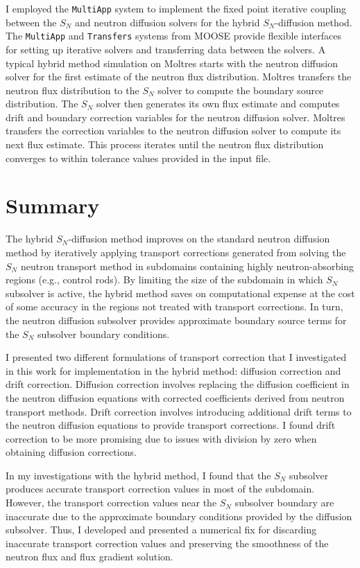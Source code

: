 I employed the \texttt{MultiApp} system \cite{gaston_physics-based_2015} to implement the fixed point
iterative coupling between the $S_N$ and neutron diffusion solvers for the hybrid $S_N$-diffusion method.
The \texttt{MultiApp} and \texttt{Transfers} systems from \gls{MOOSE} provide flexible interfaces
for setting up iterative solvers and transferring data between the solvers. A typical hybrid
method simulation on Moltres starts with the neutron diffusion solver for the first estimate of the
neutron flux distribution. Moltres transfers the neutron flux distribution to the $S_N$ solver to
compute the boundary source distribution. The $S_N$ solver then generates its own flux estimate and
computes drift and boundary correction variables for the neutron diffusion solver. Moltres
transfers the correction variables to the neutron diffusion solver to compute its next flux
estimate. This process iterates until the neutron flux distribution converges to within tolerance
values provided in the input file.

\section{Summary} \label{sec:hybrid-summary}

The hybrid $S_N$-diffusion method improves on the standard neutron
diffusion method by iteratively applying transport corrections generated from solving the $S_N$
neutron transport
method in subdomains containing highly neutron-absorbing regions (e.g., control rods). By limiting
the size of the subdomain in which $S_N$ subsolver is active, the hybrid method saves on
computational expense at the cost of some accuracy in the regions not treated with transport
corrections. In turn, the neutron diffusion subsolver provides approximate boundary source terms
for the $S_N$ subsolver boundary conditions. 

I presented two different formulations of transport correction that I investigated in this work for
implementation in the hybrid method: diffusion correction and drift correction. Diffusion
correction involves replacing the diffusion coefficient in the neutron diffusion equations with
corrected coefficients derived from neutron transport methods. Drift correction involves
introducing additional drift terms to the neutron diffusion equations to provide transport
corrections. I found drift correction to be more promising due to issues with division by zero when
obtaining diffusion corrections.

In my investigations with the hybrid method, I found that the $S_N$ subsolver produces
accurate transport correction values in most of the subdomain. However, the transport correction
values near the $S_N$ subsolver boundary are inaccurate due to the approximate boundary conditions
provided by the diffusion subsolver. Thus, I developed and presented a numerical fix for discarding
inaccurate transport correction values and preserving the smoothness of the neutron flux and flux
gradient solution.

